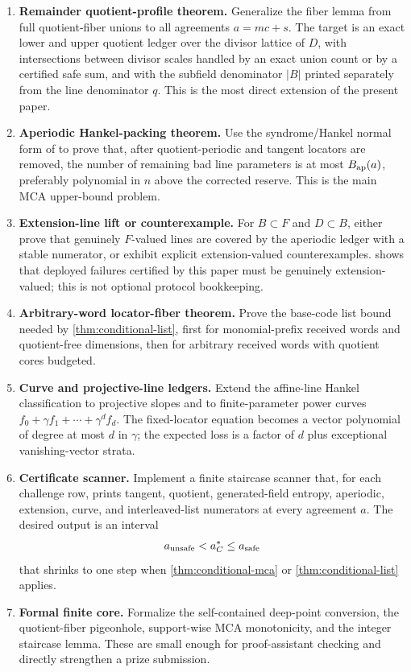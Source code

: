 \documentclass[11pt]{article}
\theoremstyle{definition}
\theoremstyle{remark}
\begin{document}
\begin{enumerate}[label=\textbf{T\arabic*.},leftmargin=2.5em]
\item \textbf{Remainder quotient-profile theorem.}  Generalize the fiber lemma
from full quotient-fiber unions to all agreements $a=mc+s$.  The target is an
exact lower and upper quotient ledger over the divisor lattice of $D$, with
intersections between divisor scales handled by an exact union count or by a
certified safe sum, and with the subfield denominator $|B|$ printed separately
from the line denominator $q$.
This is the most direct extension of the present paper.

\item \textbf{Aperiodic Hankel-packing theorem.}  Use the syndrome/Hankel normal
form of \cite{Cho26b} to prove that, after quotient-periodic and tangent
locators are removed, the number of remaining bad line parameters is at most
$B_{\rm ap}(a)$, preferably polynomial in $n$ above the corrected reserve.  This
is the main MCA upper-bound problem.

\item \textbf{Extension-line lift or counterexample.}  For $B\subset F$ and
$D\subset B$, either prove that genuinely $F$-valued lines are covered by the
aperiodic ledger with a stable numerator, or exhibit explicit extension-valued
counterexamples.   shows that deployed failures certified by
this paper must be genuinely extension-valued; this is not optional protocol
bookkeeping.

\item \textbf{Arbitrary-word locator-fiber theorem.}  Prove the base-code list
bound needed by \cref{thm:conditional-list}, first for monomial-prefix received
words and quotient-free dimensions, then for arbitrary received words with
quotient cores budgeted.

\item \textbf{Curve and projective-line ledgers.}  Extend the affine-line Hankel
classification to projective slopes and to finite-parameter power curves
$f_0+\gamma f_1+\cdots+\gamma^d f_d$.  The fixed-locator equation becomes a
vector polynomial of degree at most $d$ in $\gamma$; the expected loss is a
factor of $d$ plus exceptional vanishing-vector strata.

\item \textbf{Certificate scanner.}  Implement a finite staircase scanner that,
for each challenge row, prints tangent, quotient, generated-field entropy,
aperiodic, extension, curve, and interleaved-list numerators at every agreement
$a$.  The desired output is an interval
\[
        a_{\rm unsafe}<a_C^*\le a_{\rm safe}
\]
that shrinks to one step when \cref{thm:conditional-mca} or
\cref{thm:conditional-list} applies.

\item \textbf{Formal finite core.}  Formalize the self-contained deep-point
conversion, the quotient-fiber pigeonhole, support-wise MCA monotonicity, and
the integer staircase lemma.  These are small enough for proof-assistant
checking and directly strengthen a prize submission.
\end{enumerate}
\end{document}
